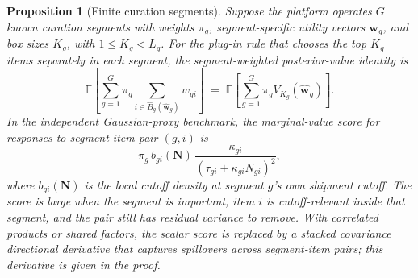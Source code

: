 \documentclass[11pt]{article}
\newtheorem{proposition}[theorem]{Proposition}
\theoremstyle{definition}
\theoremstyle{remark}
\newcommand{\E}{\mathbb{E}}
\newcommand{\1}{\mathbf{1}}
\newcommand{\w}{\mathbf{w}}
\newcommand{\N}{\mathbf{N}}
\begin{document}
\begin{proposition}[Finite curation segments]
\label{prop:finite-segments}
Suppose the platform operates \(G\) known
curation segments with weights \(\pi_g\), segment-specific utility
vectors \(\w_g\), and box sizes \(K_g\), with \(1\le K_g<L_g\). For the
plug-in rule that chooses the top \(K_g\) items separately in each
segment, the segment-weighted
posterior-value identity is
\[
\E\!\left[\sum_{g=1}^G \pi_g
\sum_{i\in \hat B_g(\hat{\w}_g)} w_{gi}\right]
\;=\;
\E\!\left[\sum_{g=1}^G \pi_g V_{K_g}(\hat{\w}_g)\right].
\]
In the independent Gaussian-proxy benchmark, the marginal-value score
for responses to segment-item pair \((g,i)\) is
\[
\pi_g\,b_{gi}(\N)\,
\frac{\kappa_{gi}}{(\tau_{gi}+\kappa_{gi}N_{gi})^2},
\]
where \(b_{gi}(\N)\) is the local cutoff density at segment \(g\)'s
own shipment cutoff. The score is large when the segment is important,
item \(i\) is cutoff-relevant inside that segment, and the pair still
has residual variance to remove. With
correlated products or shared factors, the scalar score is replaced by a
stacked covariance directional derivative that captures spillovers across
segment-item pairs; this derivative is given in the proof.
\end{proposition}
\end{document}
